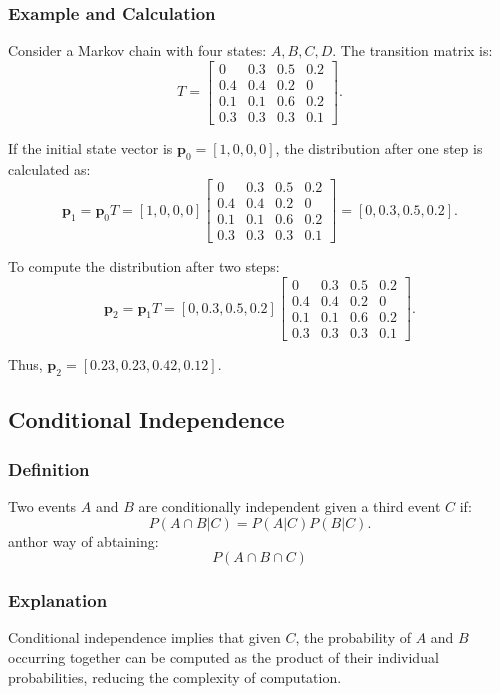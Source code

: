 \documentclass[12pt,a4paper]{article}
\begin{document}
\subsubsection{Example and Calculation}
Consider a Markov chain with four states: $A, B, C, D$. The transition matrix is:
\[
T = \begin{bmatrix}
0 & 0.3 & 0.5 & 0.2 \\
0.4 & 0.4 & 0.2 & 0 \\
0.1 & 0.1 & 0.6 & 0.2 \\
0.3 & 0.3 & 0.3 & 0.1
\end{bmatrix}.
\]

If the initial state vector is $\mathbf{p}_0 = [1, 0, 0, 0]$, the distribution after one step is calculated as:
\[
\mathbf{p}_1 = \mathbf{p}_0 T = [1, 0, 0, 0]
\begin{bmatrix}
0 & 0.3 & 0.5 & 0.2 \\
0.4 & 0.4 & 0.2 & 0 \\
0.1 & 0.1 & 0.6 & 0.2 \\
0.3 & 0.3 & 0.3 & 0.1
\end{bmatrix} = [0, 0.3, 0.5, 0.2].
\]

To compute the distribution after two steps:
\[
\mathbf{p}_2 = \mathbf{p}_1 T = [0, 0.3, 0.5, 0.2]
\begin{bmatrix}
0 & 0.3 & 0.5 & 0.2 \\
0.4 & 0.4 & 0.2 & 0 \\
0.1 & 0.1 & 0.6 & 0.2 \\
0.3 & 0.3 & 0.3 & 0.1
\end{bmatrix}.
\]


Thus, $\mathbf{p}_2 = [0.23, 0.23, 0.42, 0.12]$.

\subsection{Conditional Independence}
\subsubsection{Definition}
Two events $A$ and $B$ are conditionally independent given a third event $C$ if:
\[
P(A \cap B | C) = P(A | C) P(B | C).
\]
anthor way of abtaining:
\[
P(A\cap B\cap C)
\]

\subsubsection{Explanation}
Conditional independence implies that given $C$, the probability of $A$ and $B$ occurring together can be computed as the product of their individual probabilities, reducing the complexity of computation.
\end{document}
